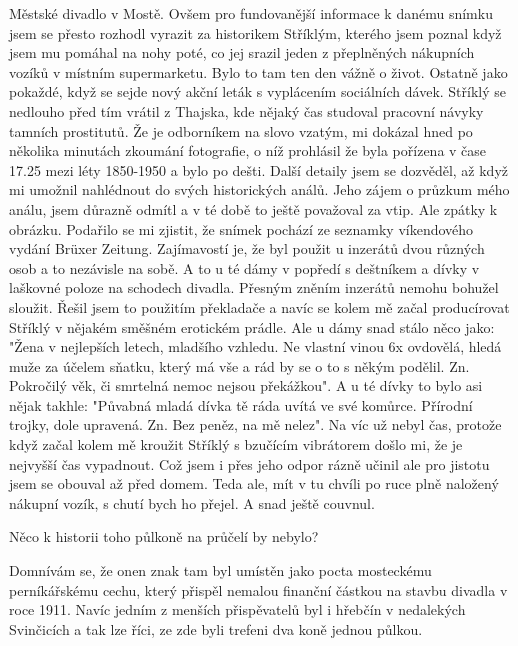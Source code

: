 
Městské divadlo v Mostě. Ovšem pro fundovanější informace k danému
snímku jsem se přesto rozhodl vyrazit za historikem Stříklým, kterého
jsem poznal když jsem mu pomáhal na nohy poté, co jej srazil jeden z
přeplněných nákupních vozíků v místním supermarketu. Bylo to tam ten
den vážně o život. Ostatně jako pokaždé, když se sejde nový akční
leták s vyplácením sociálních dávek. Stříklý se nedlouho před tím
vrátil z Thajska, kde nějaký čas studoval pracovní návyky tamních
prostitutů. Že je odborníkem na slovo vzatým, mi dokázal hned po
několika minutách zkoumání fotografie, o níž prohlásil že byla
pořízena v čase 17.25 mezi léty 1850-1950 a bylo po dešti. Další
detaily jsem se dozvěděl, až když mi umožnil nahlédnout do svých
historických análů. Jeho zájem o průzkum mého análu, jsem důrazně
odmítl a v té době to ještě považoval za vtip. Ale zpátky k obrázku.
Podařilo se mi zjistit, že snímek pochází ze seznamky víkendového
vydání Brüxer Zeitung. Zajímavostí je, že byl použit u inzerátů dvou
různých osob a to nezávisle na sobě. A to u té dámy v popředí s
deštníkem a dívky v laškovné poloze na schodech divadla. Přesným
zněním inzerátů nemohu bohužel sloužit. Řešil jsem to použitím
překladače a navíc se kolem mě začal producírovat Stříklý v nějakém
směšném erotickém prádle. Ale u dámy snad stálo něco jako: "Žena v
nejlepších letech, mladšího vzhledu. Ne vlastní vinou 6x ovdovělá,
hledá muže za účelem sňatku, který má vše a rád by se o to s někým
podělil. Zn. Pokročilý věk, či smrtelná nemoc nejsou překážkou". A u
té dívky to bylo asi nějak takhle: "Půvabná mladá dívka tě ráda uvítá
ve své komůrce. Přírodní trojky, dole upravená. Zn. Bez peněz, na mě
nelez". Na víc už nebyl čas, protože když začal kolem mě kroužit
Stříklý s bzučícím vibrátorem došlo mi, že je nejvyšší čas vypadnout.
Což jsem i přes jeho odpor rázně učinil ale pro jistotu jsem se
obouval až před domem. Teda ale, mít v tu chvíli po ruce plně naložený
nákupní vozík, s chutí bych ho přejel. A snad ještě couvnul.

Něco k historii toho půlkoně na průčelí by nebylo?

Domnívám se, že onen znak tam byl umístěn jako pocta mosteckému
perníkářskému cechu, který přispěl nemalou finanční částkou na stavbu
divadla v roce 1911. Navíc jedním z menších přispěvatelů byl i hřebčín
v nedalekých Svinčicích a tak lze říci, ze zde byli trefeni dva koně
jednou půlkou.




